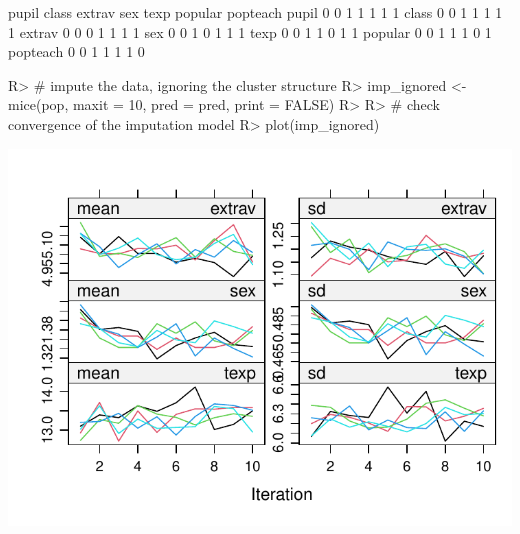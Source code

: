 \documentclass[
]{jss}
\begin{document}
\begin{CodeChunk}
\begin{CodeOutput}
         pupil class extrav sex texp popular popteach
pupil        0     0      1   1    1       1        1
class        0     0      1   1    1       1        1
extrav       0     0      0   1    1       1        1
sex          0     0      1   0    1       1        1
texp         0     0      1   1    0       1        1
popular      0     0      1   1    1       0        1
popteach     0     0      1   1    1       1        0
\end{CodeOutput}
\begin{CodeInput}
R> # impute the data, ignoring the cluster structure
R> imp_ignored <- mice(pop, maxit = 10, pred = pred, print = FALSE)
R> 
R> # check convergence of the imputation model
R> plot(imp_ignored)
\end{CodeInput}


\begin{center}\includegraphics{Manuscript_files/figure-latex/pop-ignored-1} \end{center}




\end{CodeChunk}
\end{document}
